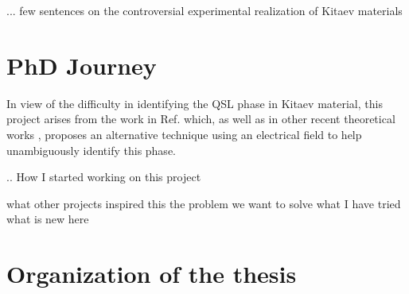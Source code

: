 ... few sentences on the controversial experimental realization of Kitaev materials

\section{PhD Journey}

In view of the difficulty in identifying the QSL phase in Kitaev material, this project arises from the work in Ref.\cite{Pereira2020} which, as well as in other recent theoretical works \cite{Aasen2020,Zhang2020}, proposes an alternative technique using an electrical field to help unambiguously identify this phase.



.. How I started working on this project

what other projects inspired this
the problem we want to solve
what I have tried
what is new here


\section{Organization of the thesis}














